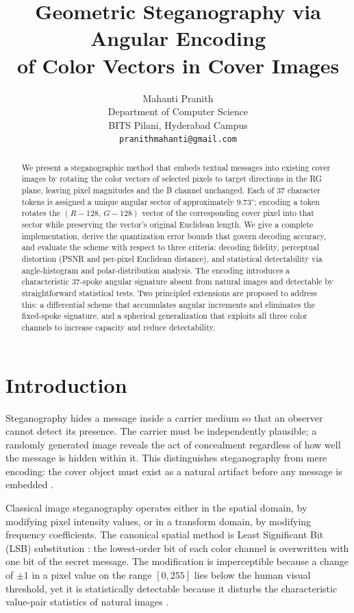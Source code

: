 \documentclass[12pt]{article}
\title{\textbf{Geometric Steganography via Angular Encoding\\
of Color Vectors in Cover Images}}
\author{
    Mahanti Pranith \\
    Department of Computer Science \\
    BITS Pilani, Hyderabad Campus \\
    \texttt{pranithmahanti@gmail.com}
}
\date{}
\begin{document}
\maketitle

\begin{abstract}
We present a steganographic method that embeds textual messages into
existing cover images by rotating the color vectors of selected pixels to
target directions in the RG plane, leaving pixel magnitudes and the B
channel unchanged. Each of 37 character tokens is assigned a unique angular
sector of approximately $9.73°$; encoding a token rotates the
$(R{-}128,\,G{-}128)$ vector of the corresponding cover pixel into that
sector while preserving the vector's original Euclidean length. We give a
complete implementation, derive the quantization error bounds that govern
decoding accuracy, and evaluate the scheme with respect to three criteria:
decoding fidelity, perceptual distortion (PSNR and per-pixel Euclidean
distance), and statistical detectability via angle-histogram and
polar-distribution analysis. The encoding introduces a characteristic
37-spoke angular signature absent from natural images and detectable by
straightforward statistical tests. Two principled extensions are proposed
to address this: a differential scheme that accumulates angular increments
and eliminates the fixed-spoke signature, and a spherical generalization
that exploits all three color channels to increase capacity and reduce
detectability.
\end{abstract}

\section{Introduction}
\label{sec:intro}

Steganography hides a message inside a carrier medium so that an observer
cannot detect its presence. The carrier must be independently plausible; a
randomly generated image reveals the act of concealment regardless of how
well the message is hidden within it. This distinguishes steganography from
mere encoding: the cover object must exist as a natural artifact before
any message is embedded \cite{simmons1984prisoners}.

Classical image steganography operates either in the spatial domain, by
modifying pixel intensity values, or in a transform domain, by modifying
frequency coefficients. The canonical spatial method is Least Significant
Bit (LSB) substitution \cite{johnson2001steganography}: the lowest-order
bit of each color channel is overwritten with one bit of the secret message.
The modification is imperceptible because a change of $\pm1$ in a pixel
value on the range $[0, 255]$ lies below the human visual threshold, yet it
is statistically detectable because it disturbs the characteristic
value-pair statistics of natural images \cite{fridrich2001detecting}.
\end{document}

